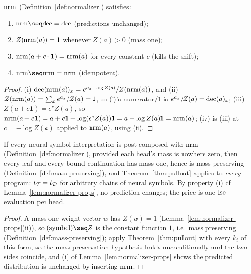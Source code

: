 \begin{lemma}
\label{lem:normalizer-props}
\leanok
$\mathrm{nrm}$ (Definition~\ref{def:normalizer}) satisfies:
\begin{enumerate}
\item[(i)] $\nrm \seq \dec = \dec$ (predictions unchanged);
\item[(ii)] $Z(\mathrm{nrm}(a)) = 1$ whenever $Z(a) > 0$ (mass one);
\item[(iii)] $\mathrm{nrm}(a + c\cdot\mathbf 1) = \mathrm{nrm}(a)$ for every constant
  $c$ (kills the shift);
\item[(iv)] $\nrm \seq \nrm = \nrm$ (idempotent).
\end{enumerate}
\end{lemma}

\begin{proof}
\leanok
(i) $\mathrm{dec}(\mathrm{nrm}(a))_x = e^{a_x-\log Z(a)}/Z(\mathrm{nrm}(a))$, and
(ii) $Z(\mathrm{nrm}(a)) = \sum_x e^{a_x}/Z(a) = 1$, so (i)'s numerator/1 is
$e^{a_x}/Z(a) = \mathrm{dec}(a)_x$; (iii) $Z(a+c\mathbf1) = e^cZ(a)$, so
$\mathrm{nrm}(a+c\mathbf1) = a+c\mathbf1-\log(e^cZ(a))\mathbf1 =
a-\log Z(a)\mathbf1 = \mathrm{nrm}(a)$; (iv) is (iii) at $c=-\log Z(a)$ applied
to $\mathrm{nrm}(a)$, using (ii).
\end{proof}

\begin{lemma}
\label{lem:normalized-heads}
\leanok
If every neural symbol interpretation is post-composed with $\mathrm{nrm}$
(Definition~\ref{def:normalizer}), provided each head's mass is nowhere
zero, then every leaf and every bound continuation has mass one, hence
is mass preserving
(Definition~\ref{def:mass-preserving}), and Theorem~\ref{thm:pullout}
applies to \emph{every} program: $t_{\mathcal T} = t_{\mathcal D}$ for arbitrary
chains of neural symbols. By property (i) of
Lemma~\ref{lem:normalizer-props}, no prediction changes; the price is
one $\operatorname{lse}$ evaluation per head.
\end{lemma}

\begin{proof}
\leanok
A mass-one weight vector $w$ has $Z(w)=1$
(Lemma~\ref{lem:normalizer-props}(ii)), so $(\text{symbol})\seq Z$ is
the constant function $1$, i.e.\ mass preserving
(Definition~\ref{def:mass-preserving}); apply
Theorem~\ref{thm:pullout} with every $k_i$ of this form, so the
mass-preservation hypothesis holds unconditionally and the two sides
coincide, and (i) of Lemma~\ref{lem:normalizer-props} shows the
predicted distribution is unchanged by inserting $\mathrm{nrm}$.
\end{proof}

